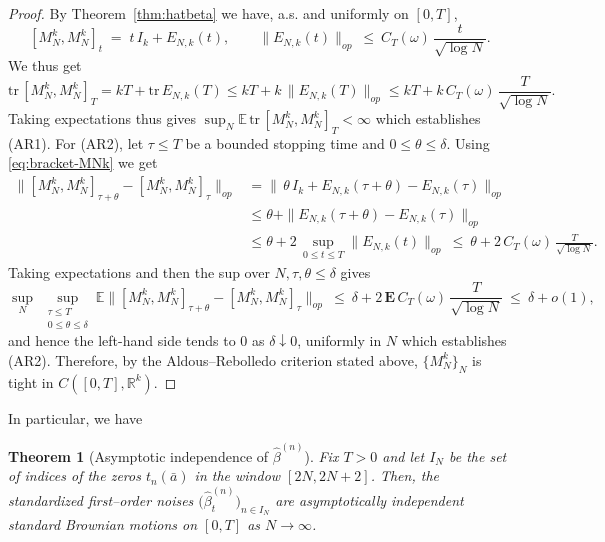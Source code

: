\documentclass[12pt,reqno]{amsart}
\theoremstyle{plain}
\newtheorem{theorem}{Theorem}[section]
\theoremstyle{definition}
\theoremstyle{remark}
\begin{document}
\begin{proof}
By Theorem~\ref{thm:hatbeta} we have, a.s.
and uniformly on $[0,T]$,
\begin{equation}\label{eq:bracket-MNk}
[ M_N^{k},M_N^{k}]_t \;=\; t\,I_k + E_{N,k}(t),
\qquad
\|E_{N,k}(t)\|_{op}\ \le\ C_T(\omega)\,\frac{t}{\sqrt{\log N}}.
\end{equation}
 We thus get 
\begin{equation}\label{eq:AR1-here}
\mathrm{tr}\,[ M_N^{k},M_N^{k}]_T
= kT + \mathrm{tr}\,E_{N,k}(T)
\le kT + k\,\|E_{N,k}(T)\|_{op}
\le kT + k\,C_T(\omega)\,\frac{T}{\sqrt{\log N}}.
\end{equation}
Taking expectations thus gives 
$\sup_N \mathbb{E}\,\mathrm{tr}\,[M_N^k,M_N^k ]_T<\infty$ which establishes (AR1). For (AR2), let $\tau\le T$ be a bounded stopping time and $0\le\theta\le\delta$.
Using \eqref{eq:bracket-MNk} we get
\begin{align}
\big\|  [M_N^k ,M^k_N]_{\tau+\theta}-[ M^k_N,M^k_N ]_{\tau} \big\|_{op}
&= \big\|\,\theta\, I_k + E_{N,k}(\tau+\theta)-E_{N,k}(\tau)\big\|_{op} \nonumber\\
&\le \theta + \|E_{N,k}(\tau+\theta)-E_{N,k}(\tau)\|_{op} \nonumber\\
&\le \theta + 2\,\sup_{0\le t\le T}\|E_{N,k}(t)\|_{op}
\ \le\ \theta + 2\,C_T(\omega)\,\frac{T}{\sqrt{\log N}}. \label{eq:AR2-raw}
\end{align}
Taking expectations and then the sup over $N,\tau,\theta\le\delta$ gives
\begin{equation}
\sup_{N}\ \sup_{\substack{\tau\le T\\ 0\le \theta\le \delta}}
\mathbb{E}\big\| [ M_N^k ,M^k_N]_{\tau+\theta}-[ M^k_N,M^k_N ]_{\tau} \big\|_{op}
\ \le\ \delta + 2\,\mathbf{E}\,C_T(\omega)\,\frac{T}{\sqrt{\log N}}
\ \le\ \delta + o(1),
\end{equation}
and hence the left-hand side tends to $0$ as $\delta\downarrow 0$, uniformly in $N$ which establishes (AR2). Therefore, by the Aldous–Rebolledo criterion stated above, $\{M_N^{k}\}_N$ is tight in $C([0,T],\mathbb{R}^k)$.
\end{proof}

In particular, we have 
\begin{theorem}[Asymptotic independence of $\hat\beta^{(n)}$]\label{cor:levy-hatbeta}
Fix $T>0$ and let $I_N$ be the set of indices of the zeros $t_n(\bar a)$ in the window $[2N,2N+2]$. 
Then, the standardized first–order noises 
$\bigl(\hat\beta^{(n)}_t\bigr)_{n\in I_N}$ are asymptotically independent standard Brownian motions on $[0,T]$ as $N\to\infty$.
\end{theorem}
\end{document}
